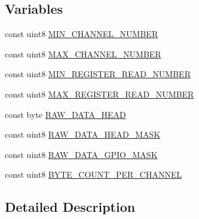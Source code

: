 \subsection*{Variables}
\begin{DoxyCompactItemize}
\item 
const uint8 \hyperlink{group___a_d_c_const_gaff6e830c5e1a3e3f8ebfe62d87935343}{M\-I\-N\-\_\-\-C\-H\-A\-N\-N\-E\-L\-\_\-\-N\-U\-M\-B\-E\-R}
\item 
const uint8 \hyperlink{group___a_d_c_const_ga1b3e7a83a17af02b710462a5d5a7f07d}{M\-A\-X\-\_\-\-C\-H\-A\-N\-N\-E\-L\-\_\-\-N\-U\-M\-B\-E\-R}
\item 
const uint8 \hyperlink{group___a_d_c_const_gad2849e61d3cd66264402c979ea442482}{M\-I\-N\-\_\-\-R\-E\-G\-I\-S\-T\-E\-R\-\_\-\-R\-E\-A\-D\-\_\-\-N\-U\-M\-B\-E\-R}
\item 
const uint8 \hyperlink{group___a_d_c_const_ga93e25f097a114b3c63521c9577d6cf3a}{M\-A\-X\-\_\-\-R\-E\-G\-I\-S\-T\-E\-R\-\_\-\-R\-E\-A\-D\-\_\-\-N\-U\-M\-B\-E\-R}
\item 
const byte \hyperlink{group___a_d_c_const_ga9392c719440ddaadb93274ea1991f5e3}{R\-A\-W\-\_\-\-D\-A\-T\-A\-\_\-\-H\-E\-A\-D}
\item 
const uint8 \hyperlink{group___a_d_c_const_gac3583fffe9a0fb24d6fb98c9f9cc8a1c}{R\-A\-W\-\_\-\-D\-A\-T\-A\-\_\-\-H\-E\-A\-D\-\_\-\-M\-A\-S\-K}
\item 
const uint8 \hyperlink{group___a_d_c_const_ga98a2af1e431aae3df949302c2df8bf28}{R\-A\-W\-\_\-\-D\-A\-T\-A\-\_\-\-G\-P\-I\-O\-\_\-\-M\-A\-S\-K}
\item 
const uint8 \hyperlink{group___a_d_c_const_ga87610d16f454ffdd80a79e3c24bcaff6}{B\-Y\-T\-E\-\_\-\-C\-O\-U\-N\-T\-\_\-\-P\-E\-R\-\_\-\-C\-H\-A\-N\-N\-E\-L}
\end{DoxyCompactItemize}


\subsection{Detailed Description}


